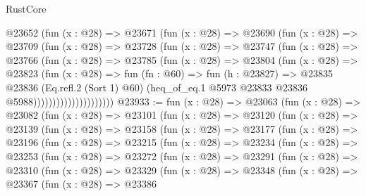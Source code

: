 \begin{lexlean}{RustCore}
\begin{coremodule}
                      @23652
                        (fun (x : @28) =>
                        @23671
                          (fun (x : @28) =>
                          @23690
                            (fun (x : @28) =>
                            @23709
                              (fun (x : @28) =>
                              @23728
                                (fun (x : @28) =>
                                @23747
                                  (fun (x : @28) =>
                                  @23766
                                    (fun (x : @28) =>
                                    @23785
                                      (fun (x : @28) =>
                                      @23804
                                        (fun (x : @28) =>
                                        @23823
                                          (fun (x : @28) =>
                                          fun (fn : @60) =>
                                          fun (h : @23827) =>
                                          @23835
                                            @23836
                                            (Eq.refl.{2} (Sort 1) @60)
                                            (heq_of_eq.{1}
                                              @5973
                                              @23833
                                              @23836
                                              @5988)))))))))))))))))))))
@23933 := fun (x : @28) =>
  @23063
    (fun (x : @28) =>
    @23082
      (fun (x : @28) =>
      @23101
        (fun (x : @28) =>
        @23120
          (fun (x : @28) =>
          @23139
            (fun (x : @28) =>
            @23158
              (fun (x : @28) =>
              @23177
                (fun (x : @28) =>
                @23196
                  (fun (x : @28) =>
                  @23215
                    (fun (x : @28) =>
                    @23234
                      (fun (x : @28) =>
                      @23253
                        (fun (x : @28) =>
                        @23272
                          (fun (x : @28) =>
                          @23291
                            (fun (x : @28) =>
                            @23310
                              (fun (x : @28) =>
                              @23329
                                (fun (x : @28) =>
                                @23348
                                  (fun (x : @28) =>
                                  @23367
                                    (fun (x : @28) =>
                                    @23386

\end{coremodule}
\end{lexlean}
